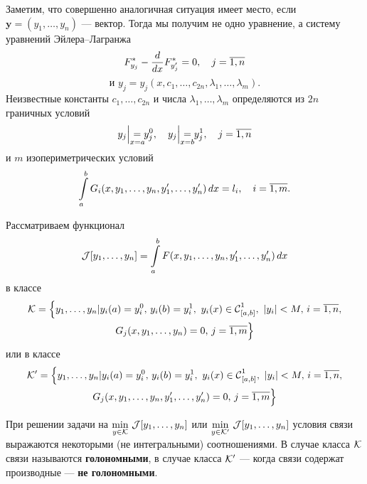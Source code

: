\begin{enumerateD}
	Заметим, что совершенно аналогичная ситуация имеет место, если $\bm{y}=(y_1,\ldots,y_n)$ --- вектор. Тогда мы получим не одно уравнение, а систему уравнений Эйлера--Лагранжа
	\begin{equation*}
		\hfill F^{\ast}_{y_j}-\der{}{x}F^{\ast}_{y'_j}=0,\quad j=\overline{1,n}\hfill
	\end{equation*}
	\begin{equation*}	
		\text{и }y_j=y_j(x,c_1,\ldots,c_{2n},\lambda_1,\ldots,\lambda_m).
	\end{equation*}
	Неизвестные константы $c_1,\ldots,c_{2n}$ и числа $\lambda_1,\ldots,\lambda_m$ определяются из $2n$ граничных условий
	\begin{equation*}
		\hfill y_j\Big|_{\lefteqn{\scriptstyle x=a}}=y_j^0,\quad y_j\Big|_{\lefteqn{\scriptstyle x=b}}=y_j^1,\quad j=\overline{1,n}\hfill
	\end{equation*}
	и $m$ изопериметрических условий
	\begin{equation*}
		\hfill \int\limits_a^b G_i(x,y_1,\ldots,y_n,y'_1,\ldots,y'_n)\,dx=l_i,\quad i=\overline{1,m}.\hfill
	\end{equation*}
	\item Рассматриваем функционал 
	\begin{equation*}
		\hfill\J[y_1,\ldots,y_n]=\int\limits_a^b F(x,y_1,\ldots,y_n,y'_1,\ldots,y'_n)\,dx\hfill
	\end{equation*}
	в классе 
	\begin{multline*}
		\K=\Big\{y_1,\ldots,y_n|y_i(a)=y_i^0,\,y_i(b)=y_i^1,\ y_i(x)\in\Cfn[{[a,b]}]{1},\ |y_i|<M,\,i=\overline{1,n},\\ G_j(x,y_1,\ldots,y_n)=0,\,j=\overline{1,m}\Big\}
	\end{multline*}
	или в классе
	\begin{multline*}
		\K'=\Big\{y_1,\ldots,y_n|y_i(a)=y_i^0,\,y_i(b)=y_i^1,\ y_i(x)\in\Cfn[{[a,b]}]{1},\ |y_i|<M,\,i=\overline{1,n},\\ G_j(x,y_1,\ldots,y_n,y'_1,\ldots,y'_n)=0,\,j=\overline{1,m}\Big\}
	\end{multline*}
	
	При решении задачи на $\min\limits_{y\in\mathcal{K}}\,\mathcal{J}[y_1,\ldots,y_n]$ или $\min\limits_{y\in\mathcal{K}'}\,\mathcal{J}[y_1,\ldots,y_n]$ условия связи выражаются некоторыми (не интегральными) соотношениями. В случае класса $\mathcal{K}$ связи называются \textbf{голономными}, в случае класса $\mathcal{K}'$ --- когда связи содержат производные --- \textbf{не голономными}.
	

\end{enumerateD}
